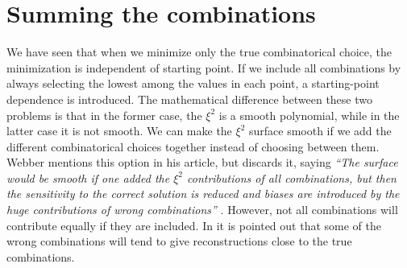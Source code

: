 \documentclass[twoside,english]{uiofysmaster}
\begin{document}
\section{Summing the combinations}
\label{sec:combinatorics-sum_all_contributions}
We have seen that when we minimize only the true combinatorical choice, the minimization is independent of starting point. If we include all combinations by always selecting the lowest among the values in each point, a starting-point dependence is introduced. The mathematical difference between these two problems is that in the former case, the $\xi^2$ is a smooth polynomial, while in the latter case it is not smooth. We can make the $\xi^2$ surface smooth if we add the different combinatorical choices together instead of choosing between them. Webber mentions this option in his article, but discards it, saying {\it ``The surface would be smooth if one added the $\xi^2$ contributions of all combinations,  but then the sensitivity to the correct solution is reduced and biases are introduced by the huge contributions of wrong combinations''} \cite[p.\ 6]{Webber:2009vm}. However, not all combinations will contribute equally if they are included. In \cite{Gripaios:2011jm} it is pointed out that some of the wrong combinations will tend to give reconstructions close to the true combinations. 
\end{document}
